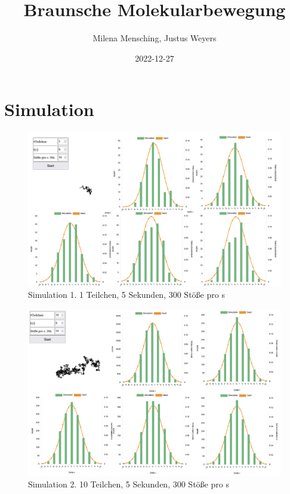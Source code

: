 \documentclass[
  9pt,
]{article}
\title{Braunsche Molekularbewegung}
\author{Milena Mensching, Justus Weyers}
\date{2022-12-27}
\begin{document}
\maketitle

\hypertarget{simulation}{%
\section{Simulation}\label{simulation}}

\begin{figure}
\centering
\includegraphics[width=\textwidth,height=0.1\textheight]{Daten/a.png}
\caption{Simulation 1. 1 Teilchen, 5 Sekunden, 300 Stöße pro s}
\end{figure}

\begin{figure}
\centering
\includegraphics[width=\textwidth,height=0.1\textheight]{Daten/b.png}
\caption{Simulation 2. 10 Teilchen, 5 Sekunden, 300 Stöße pro s}
\end{figure}
\end{document}

